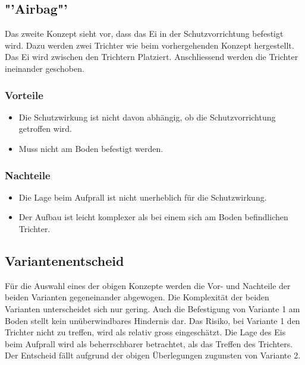 \documentclass[a4paper,10pt,fleqn]{article}
\begin{document}
\subsection{"'Airbag"'}
Das zweite Konzept sieht vor, dass das Ei in der Schutzvorrichtung befestigt 
wird. Dazu werden zwei Trichter wie beim vorhergehenden Konzept hergestellt. 
Das Ei wird zwischen den Trichtern Platziert. Anschliessend werden die 
Trichter ineinander geschoben. 

\subsubsection*{Vorteile}
\begin{itemize}
  \item Die Schutzwirkung ist nicht davon abhängig, ob die Schutzvorrichtung 
        getroffen wird. 
  \item Muss nicht am Boden befestigt werden. 
\end{itemize}

\subsubsection*{Nachteile}
\begin{itemize}
  \item Die Lage beim Aufprall ist nicht unerheblich für die Schutzwirkung. 
  \item Der Aufbau ist leicht komplexer als bei einem sich am Boden 
        befindlichen Trichter. 
\end{itemize}

\subsection{Variantenentscheid}
Für die Auswahl eines der obigen Konzepte werden die Vor- und Nachteile der 
beiden Varianten gegeneinander abgewogen. 
Die Komplexität der beiden Varianten unterscheidet sich nur gering. Auch die 
Befestigung von Variante 1 am Boden stellt kein unüberwindbares Hindernis dar. 
Das Risiko, bei Variante 1 den Trichter nicht zu treffen, wird als relativ 
gross eingeschätzt. Die Lage des Eis beim Aufprall wird als beherrschbarer 
betrachtet, als das Treffen des Trichters. 
Der Entscheid fällt aufgrund der obigen Überlegungen zugunsten von Variante 2. 
\end{document}
